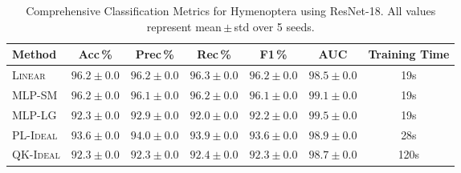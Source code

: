 \begin{table}[ht]
\centering
\caption{Comprehensive Classification Metrics for Hymenoptera using ResNet-18. All values represent mean\,$\pm$\,std over 5 seeds.}
\label{tab:full_metrics_hymenoptera_resnet18}
\setlength{\tabcolsep}{4pt}
\begin{tabular}{lcccccc}
\toprule
\textbf{Method} & \textbf{Acc\,\%} & \textbf{Prec\,\%} & \textbf{Rec\,\%} & \textbf{F1\,\%} & \textbf{AUC} & \textbf{Training Time} \\
\midrule
\textsc{Linear} & $96.2 \pm 0.0$ & $96.2 \pm 0.0$ & $96.3 \pm 0.0$ & $96.2 \pm 0.0$ & $98.5 \pm 0.0$ & 19s \\
\textsc{MLP-SM} & $96.2 \pm 0.0$ & $96.1 \pm 0.0$ & $96.2 \pm 0.0$ & $96.1 \pm 0.0$ & $99.1 \pm 0.0$ & 19s \\
\textsc{MLP-LG} & $92.3 \pm 0.0$ & $92.9 \pm 0.0$ & $92.0 \pm 0.0$ & $92.2 \pm 0.0$ & $99.5 \pm 0.0$ & 19s \\
\textsc{PL-Ideal} & $93.6 \pm 0.0$ & $94.0 \pm 0.0$ & $93.9 \pm 0.0$ & $93.6 \pm 0.0$ & $98.9 \pm 0.0$ & 28s \\
\textsc{QK-Ideal} & $92.3 \pm 0.0$ & $92.3 \pm 0.0$ & $92.4 \pm 0.0$ & $92.3 \pm 0.0$ & $98.7 \pm 0.0$ & 120s \\
\bottomrule
\end{tabular}
\end{table}
